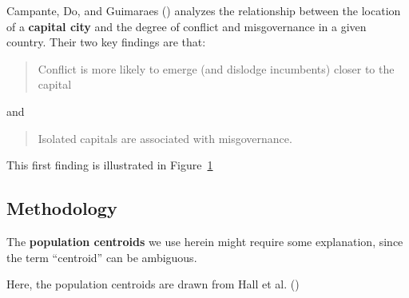 \documentclass[
  letterpaper,
  DIV=11,
  numbers=noendperiod]{scrartcl}
\begin{document}
Campante, Do, and Guimaraes ()
analyzes the relationship between the location of a \textbf{capital
city} and the degree of conflict and misgovernance in a given country.
Their two key findings are that:

\begin{quote}
Conflict is more likely to emerge (and dislodge incumbents) closer to
the capital
\end{quote}

and

\begin{quote}
Isolated capitals are associated with misgovernance.
\end{quote}

This first finding is illustrated in Figure~\ref{fig-conflict-dist}

\begin{figure}


\caption{\label{fig-conflict-dist}}

\end{figure}%

\subsection{Methodology}\label{methodology}

The \textbf{population centroids} we use herein might require some
explanation, since the term ``centroid'' can be ambiguous.

Here, the population centroids are drawn from Hall et al.
()
\end{document}
